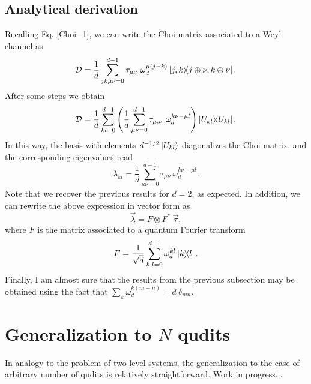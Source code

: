\subsection{Analytical derivation }
% 
Recalling Eq. \ref{Choi_1}, we can write the Choi matrix associated to a Weyl channel as
% 
\begin{equation}
 \mathcal{D} =  \frac{1}{d}\sum_{jk\mu\nu=0}^{d-1} \tau_{\mu\nu}~ \omega_d^{\mu (j-k)} \dyad{j,k}{j\oplus \nu,k\oplus \nu}.
\end{equation}
% 
After some steps we obtain 
% 
\begin{equation}
 \mathcal{D} =  \frac{1}{d}\sum_{kl=0}^{d-1} \left(\frac{1}{d}\sum_{\mu\nu=0}^{d-1}\tau_{\mu,\nu}~ \omega_d^{k\nu -\mu l} \right)\dyad{U_{kl}}.
\end{equation}
% 
In this way, the basis with elements $d^{-1/2}\ket{U_{kl}}$ diagonalizes the Choi matrix, and the corresponding eigenvalues read
% 
\begin{equation}
 \lambda_{kl}=\frac{1}{d}\sum_{\mu\nu=0}^{d-1}\tau_{\mu\nu}~ \omega_d^{k\nu -\mu l}.
\end{equation}
% 
Note that we recover the previous results for $d=2$, as expected. In addition, we can rewrite the above expression in vector form as
% 
\begin{equation}
 \vec{\lambda}=F\otimes F^*~\vec{\tau},
\end{equation}
% 
where $F$ is the matrix associated to a quantum Fourier transform
% 
\begin{equation}
 F=\frac{1}{\sqrt{d}}\sum_{k,l=0}^{d-1}\omega_d^{kl}\dyad{k}{l}.
\end{equation}
% 
Finally, I am almost sure that the results from the previous subsection may be obtained using the fact that $\sum_k\omega_d^{k(m-n)}=d~\delta_{mn}$.

\section{Generalization to $N$ qudits}
% 
In analogy to the problem of two level systems, the generalization to the case of arbitrary number of qudits is relatively straightforward. Work in progress...
